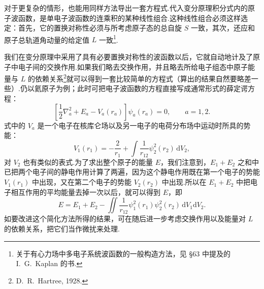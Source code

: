 对于更复杂的情形，也能用同样方法导出一套方程式.代入变分原理积分式内的原子波函数，是单电子波函数的连乘积的某种线性组合.这种线性组合必须这样选定：首先，它的置换对称性必须与所考虑原子态的总自旋 $S$ 一致，其次，还应和原子总轨道角动量的给定值 $L$ 一致\footnote{关于有心力场中多电子系统波函数的一般构造方法，见 §63 中提及的 I.~G.~Kaplan 的书.}.

我们在变分原理中采用了具有必要置换对称性的波函数以后，它就自动地计及了原子中电子间的交换作用.如果我们略去交换作用，并且略去所给电子组态中原子能量与 $L$ 的依赖关系\footnote{D.~R.~Hartree, 1928.}就可以得到一套比较简单的方程式（算出的结果自然要略差一些）.仍以氦原子为例；此时可把电子波函数的方程直接写成通常形式的薛定谔方程：
\begin{equation}
  \left[\frac{1}{2}\nabla_a^{2}+E_a-V_a(r_a)\right]\psi_a(r_a)=0,
  \qquad a=1,2.
\end{equation}
式中的 $V_a$ 是一个电子在核库仑场以及另一电子的电荷分布场中运动时所具的势能：
\begin{equation}
  V_1(r_1)=-\frac{2}{r_1}+\int\frac{1}{r_{12}}\psi_2^{2}(r_2)\,\mathrm{d}V_2,
\end{equation}
对 $V_2$ 也有类似的表式.为了求出整个原子的能量 $E$，我们注意到，$E_1+E_2$ 之和中已把两个电子间的静电作用计算了两遍，因为这个静电作用既在第一个电子的势能 $V_1(r_1)$ 中出现，又在第二个电子的势能 $V_2(r_2)$ 中出现.所以在 $E_1+E_2$ 中把电子相互作用的平均能量去掉一次以后，就可以得到 $E$，即
\begin{equation}
  E=E_1+E_2-\iint\frac{1}{r_{12}}\psi_1^{2}(r_1)\psi_2^{2}(r_2)\,\mathrm{d}V_1\mathrm{d}V_2.
\end{equation}
如要改进这个简化方法所得的结果，可在随后进一步考虑交换作用以及能量对 $L$ 的依赖关系，把它们当作微扰来处理.

